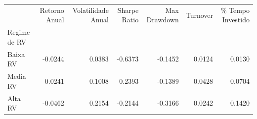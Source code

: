 \begin{tabular}{lrrrrrr}
\toprule
 & Retorno Anual & Volatilidade Anual & Sharpe Ratio & Max Drawdown & Turnover & \% Tempo Investido \\
Regime de RV &  &  &  &  &  &  \\
\midrule
Baixa RV & -0.0244 & 0.0383 & -0.6373 & -0.1452 & 0.0124 & 0.0130 \\
Media RV & 0.0241 & 0.1008 & 0.2393 & -0.1389 & 0.0428 & 0.0704 \\
Alta RV & -0.0462 & 0.2154 & -0.2144 & -0.3166 & 0.0242 & 0.1420 \\
\bottomrule
\end{tabular}